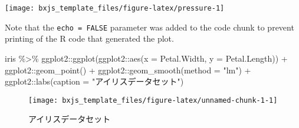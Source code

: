 \documentclass[
  12pt,
  a4paper,xelatex,ja=standard]{bxjsslide}
\newenvironment{Shaded}{\begin{snugshade}}{\end{snugshade}}
\newcommand{\AttributeTok}[1]{\textcolor[rgb]{0.77,0.63,0.00}{#1}}
\newcommand{\FunctionTok}[1]{\textcolor[rgb]{0.00,0.00,0.00}{#1}}
\newcommand{\NormalTok}[1]{#1}
\newcommand{\SpecialCharTok}[1]{\textcolor[rgb]{0.00,0.00,0.00}{#1}}
\newcommand{\StringTok}[1]{\textcolor[rgb]{0.31,0.60,0.02}{#1}}
\begin{document}
\begin{center}\texttt{[image: bxjs\_template\_files/figure-latex/pressure-1]} \end{center}

Note that the \texttt{echo\ =\ FALSE} parameter was added to the code
chunk to prevent printing of the R code that generated the plot.

\newpage

\begin{Shaded}
\begin{Highlighting}[numbers=left,,]
\NormalTok{iris }\SpecialCharTok{\%\textgreater{}\%} 
\NormalTok{  ggplot2}\SpecialCharTok{::}\FunctionTok{ggplot}\NormalTok{(ggplot2}\SpecialCharTok{::}\FunctionTok{aes}\NormalTok{(}\AttributeTok{x =}\NormalTok{ Petal.Width, }\AttributeTok{y =}\NormalTok{ Petal.Length)) }\SpecialCharTok{+} 
\NormalTok{    ggplot2}\SpecialCharTok{::}\FunctionTok{geom\_point}\NormalTok{() }\SpecialCharTok{+} 
\NormalTok{    ggplot2}\SpecialCharTok{::}\FunctionTok{geom\_smooth}\NormalTok{(}\AttributeTok{method =} \StringTok{"lm"}\NormalTok{) }\SpecialCharTok{+}
\NormalTok{    ggplot2}\SpecialCharTok{::}\FunctionTok{labs}\NormalTok{(}\AttributeTok{caption =} \StringTok{"アイリスデータセット"}\NormalTok{)}
\end{Highlighting}
\end{Shaded}

\begin{figure}

{\centering \texttt{[image: bxjs\_template\_files/figure-latex/unnamed-chunk-1-1]} 

}

\caption{アイリスデータセット}\label{fig:unnamed-chunk-1}
\end{figure}
\end{document}
